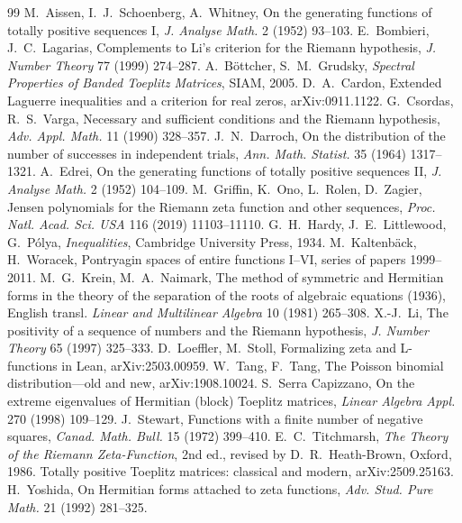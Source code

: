 \documentclass[11pt]{amsart}
\theoremstyle{plain}
\theoremstyle{definition}
\begin{document}
\begin{thebibliography}{99}
 M.~Aissen, I.~J.~Schoenberg, A.~Whitney, On the generating functions of totally positive sequences I, \emph{J. Analyse Math.} 2 (1952) 93--103.
 E.~Bombieri, J.~C.~Lagarias, Complements to Li's criterion for the Riemann hypothesis, \emph{J. Number Theory} 77 (1999) 274--287.
 A.~B\"ottcher, S.~M.~Grudsky, \emph{Spectral Properties of Banded Toeplitz Matrices}, SIAM, 2005.
 D.~A.~Cardon, Extended Laguerre inequalities and a criterion for real zeros, arXiv:0911.1122.
 G.~Csordas, R.~S.~Varga, Necessary and sufficient conditions and the Riemann hypothesis, \emph{Adv. Appl. Math.} 11 (1990) 328--357.
 J.~N.~Darroch, On the distribution of the number of successes in independent trials, \emph{Ann. Math. Statist.} 35 (1964) 1317--1321.
 A.~Edrei, On the generating functions of totally positive sequences II, \emph{J. Analyse Math.} 2 (1952) 104--109.
 M.~Griffin, K.~Ono, L.~Rolen, D.~Zagier, Jensen polynomials for the Riemann zeta function and other sequences, \emph{Proc. Natl. Acad. Sci. USA} 116 (2019) 11103--11110.
 G.~H.~Hardy, J.~E.~Littlewood, G.~P\'olya, \emph{Inequalities}, Cambridge University Press, 1934.
 M.~Kaltenb\"ack, H.~Woracek, Pontryagin spaces of entire functions I--VI, series of papers 1999--2011.
 M.~G.~Krein, M.~A.~Naimark, The method of symmetric and Hermitian forms in the theory of the separation of the roots of algebraic equations (1936), English transl. \emph{Linear and Multilinear Algebra} 10 (1981) 265--308.
 X.-J.~Li, The positivity of a sequence of numbers and the Riemann hypothesis, \emph{J. Number Theory} 65 (1997) 325--333.
 D.~Loeffler, M.~Stoll, Formalizing zeta and L-functions in Lean, arXiv:2503.00959.
 W.~Tang, F.~Tang, The Poisson binomial distribution---old and new, arXiv:1908.10024.
 S.~Serra Capizzano, On the extreme eigenvalues of Hermitian (block) Toeplitz matrices, \emph{Linear Algebra Appl.} 270 (1998) 109--129.
 J.~Stewart, Functions with a finite number of negative squares, \emph{Canad. Math. Bull.} 15 (1972) 399--410.
 E.~C.~Titchmarsh, \emph{The Theory of the Riemann Zeta-Function}, 2nd ed., revised by D.~R.~Heath-Brown, Oxford, 1986.
 Totally positive Toeplitz matrices: classical and modern, arXiv:2509.25163.
 H.~Yoshida, On Hermitian forms attached to zeta functions, \emph{Adv. Stud. Pure Math.} 21 (1992) 281--325.
\end{thebibliography}
\end{document}
